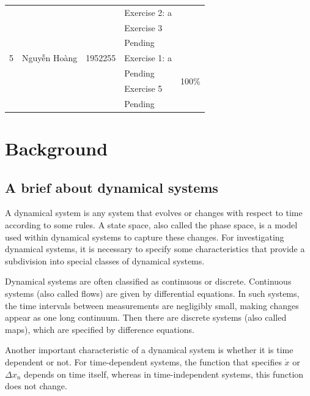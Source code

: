 \documentclass[a4paper]{article}
\numberwithin{equation}{section}
\begin{document}
\begin{center}
\begin{tabular}{llclc}
                 &                       &                     & Exercise 2: a     &                             \\
                 &                       &                     & Exercise 3        &                             \\
                 &                       &                     & Pending           &                             \\
    \midrule
    5            & Nguyễn Hoàng          & 1952255             & Exercise 1: a     & \multirow{4}{*}{100\%}      \\
                 &                       &                     & Pending           &                             \\
                 &                       &                     & Exercise 5        &                             \\
                 &                       &                     & Pending           &                             \\
    \bottomrule
  \end{tabular}
\end{center}


\newpage
\section{Background}
\subsection{A brief about dynamical systems}
A dynamical system is any system that evolves or changes with respect to time according to some rules.
A state space, also called the phase space, is a model used within dynamical systems to capture these changes.
For investigating dynamical systems, it is necessary to specify some characteristics that provide a subdivision into special classes of dynamical systems.

Dynamical systems are often classified as continuous or discrete.
Continuous systems (also called flows) are given by differential equations.
In such systems, the time intervals between measurements are negligibly small, making changes appear as one long continuum.
Then there are discrete systems (also called maps), which are specified by difference equations.

Another important characteristic of a dynamical system is whether it is time dependent or not.
For time-dependent systems, the function that specifies \(\dot{x}\) or \(\Delta{x_n}\) depends on time itself, whereas in time-independent systems, this function does not change.
\end{document}
